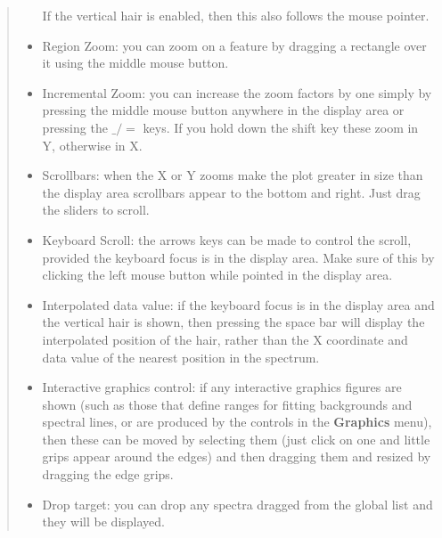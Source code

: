 \documentclass[twoside,11pt,nolof]{starlink}
\renewcommand{\menuitem}[1]{\textbf{#1}}
\begin{document}
\begin{quote}
\begin{itemize}
  If the vertical hair is enabled, then this also follows the mouse
  pointer.

  \item Region Zoom: you can zoom on a feature by dragging a rectangle
  over it using the middle mouse button.

  \item Incremental Zoom: you can increase the zoom factors by one
  simply by pressing the middle mouse button anywhere in the display
  area or pressing the $\_/=$ keys. If you hold down the shift key
  these zoom in Y, otherwise in X.

  \item Scrollbars: when the X or Y zooms make the plot greater in size
  than the display area scrollbars appear to the bottom and right. Just
  drag the sliders to scroll.

  \item Keyboard Scroll: the arrows keys can be made to control the
  scroll, provided the keyboard focus is in the display area. Make sure
  of this by clicking the left mouse button while pointed in the display
  area.

  \item Interpolated data value: if the keyboard focus is in the
  display area and the vertical hair is shown, then pressing the space
  bar will display the interpolated position of the hair, rather than
  the X coordinate and data value of the nearest position in the
  spectrum.

  \item Interactive graphics control: if any interactive graphics figures are
  shown (such as those that define ranges for fitting backgrounds and spectral
  lines, or are produced by the controls in the \menuitem{Graphics} menu),
  then these can be moved by selecting them (just click on one and little
  grips appear around the edges) and then dragging them and resized by
  dragging the edge grips.

  \item Drop target: you can drop any spectra dragged from the global
  list and they will be displayed.

 \end{itemize}
\end{quote}
\end{document}
